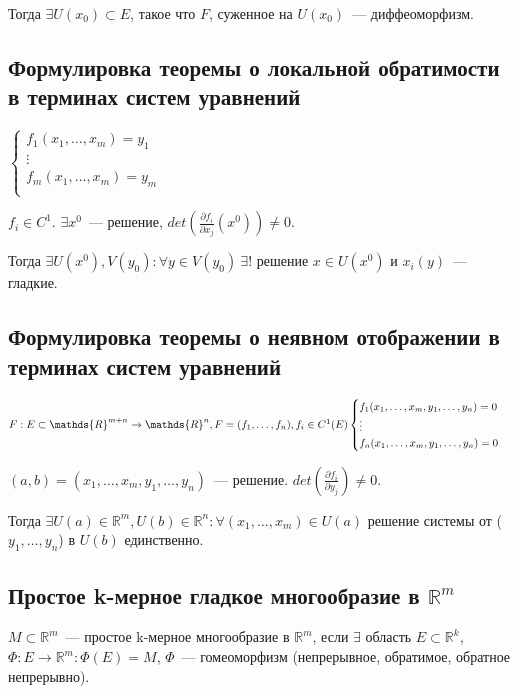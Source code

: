 \documentclass[paper=a4, fontsize=11pt]{article}
\begin{document}
Тогда $\exists U(x_0) \subset E$, такое что $F$, суженное на $U(x_0)$~--- диффеоморфизм.

\subsection{Формулировка теоремы о локальной обратимости в терминах систем уравнений}
$
    \begin{cases}
        f_1(x_1,\dots,x_m) = y_1 \\
        \vdots \\
        f_m(x_1,\dots,x_m) = y_m \\
    \end{cases}
$

$f_i \in C^1$. $\exists x^0$~--- решение, $det(\frac{\partial f_i}{\partial x_j}(x^0)) \neq 0$.

Тогда $\exists U(x^0), V(y_0): \forall y \in V(y_0)\ \exists!$ решение $x \in U(x^0)$ и $x_i(y)$~--- гладкие.

\subsection{Формулировка теоремы о неявном отображении в терминах систем уравнений}
$
    F: E \subset \mathds{R}^{m+n} \rightarrow \mathds{R}^n, F = (f_1,\dots,f_n), f_i \in C^1(E) \\
    \begin{cases}
        f_1(x_1,\dots,x_m,y_1,\dots,y_n) = 0 \\
        \vdots \\
        f_n(x_1,\dots,x_m,y_1,\dots,y_n) = 0 \\
    \end{cases}
$

$(a,b) = (x_1,\dots,x_m,y_1,\dots,y_n)$~--- решение. $det(\frac{\partial f_i}{\partial y_j}) \neq 0$.

Тогда $\exists U(a) \in \mathds{R}^m, U(b) \in \mathds{R}^n: \forall (x_1,\dots,x_m) \in U(a)$ решение системы от ($y_1,\dots,y_n$)
в $U(b)$ единственно.

\subsection{Простое k-мерное гладкое многообразие в $\mathds{R}^m$}
$M \subset \mathds{R}^m$~--- простое k-мерное многообразие в $\mathds{R}^m$,
если $\exists$ область $E \subset \mathds{R}^k$, $\Phi: E \rightarrow \mathds{R}^m: \Phi(E) = M$,
$\Phi$~--- гомеоморфизм (непрерывное, обратимое, обратное непрерывно).
\end{document}

